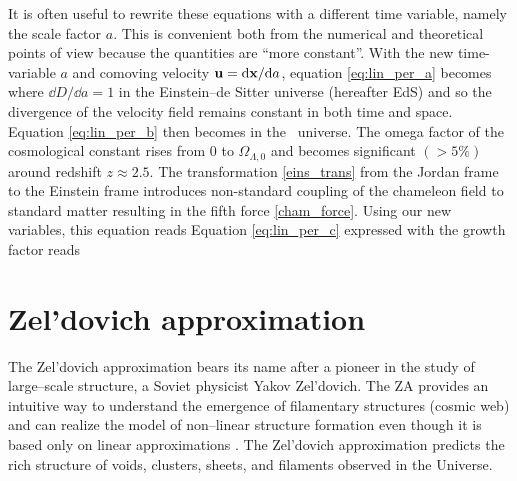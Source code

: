 It is often useful to rewrite these equations with a different time variable, namely the scale factor $a$. This is convenient both from the numerical and theoretical points of view because the quantities are ``more constant''. With the new time-variable $a$ and comoving velocity $\mathbf u = \mbox{d} \mathbf x/\mbox{d} a$, equation \eqref{eq:lin_per_a} becomes
where $\dd D/\dd a = 1$ in the Einstein--de Sitter universe (hereafter EdS) and so the divergence of the velocity field remains constant in both time and space. Equation \eqref{eq:lin_per_b} then becomes
in the \LCDM\ universe. The omega factor of the cosmological constant
rises from $0$ to $\Omega_{\Lambda,0}$ and becomes significant $(>5\%)$ around redshift $z\approx2.5$. The transformation \eqref{eins_trans} from the Jordan frame to the Einstein frame introduces non-standard coupling of the chameleon field to standard matter resulting in the fifth force \eqref{cham_force}. Using our new variables, this equation reads
Equation \eqref{eq:lin_per_c} expressed with the growth factor reads
\section{Zel'dovich approximation}
The Zel'dovich approximation \parencite[hereafter ZA;][]{1970A&A.....5...84Z} bears its name after a pioneer in the study of large--scale structure, a Soviet physicist Yakov Zel'dovich. The ZA provides an intuitive way to understand the emergence of filamentary structures (cosmic web) and can realize the model of non--linear structure formation even though it is based only on linear approximations \parencite{2014MNRAS.439.3630W}. The Zel’dovich approximation predicts the rich structure of voids, clusters, sheets, and filaments observed in the Universe.

